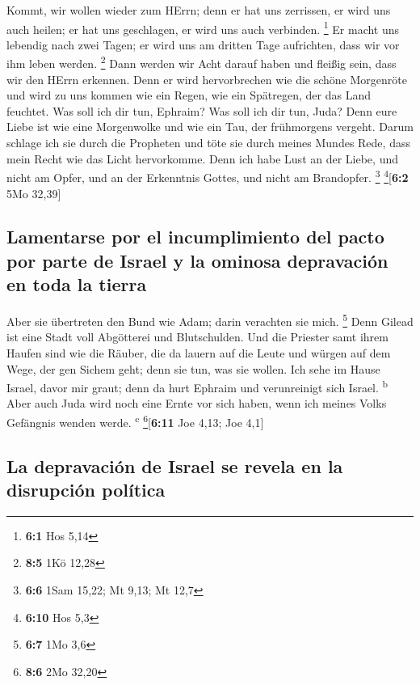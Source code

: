  Kommt, wir wollen wieder zum HErrn; denn er hat uns
zerrissen, er wird uns auch heilen; er hat uns geschlagen, er wird uns
auch verbinden. \footnote{\textbf{6:1} Hos 5,14}  Er macht
uns lebendig nach zwei Tagen; er wird uns am dritten Tage aufrichten,
dass wir vor ihm leben werden. \footnote{\textbf{8:5} 1Kö 12,28}
 Dann werden wir Acht darauf haben und fleißig sein, dass
wir den HErrn erkennen. Denn er wird hervorbrechen wie die schöne
Morgenröte und wird zu uns kommen wie ein Regen, wie ein Spätregen, der
das Land feuchtet.  Was soll ich dir tun, Ephraim? Was
soll ich dir tun, Juda? Denn eure Liebe ist wie eine Morgenwolke und wie
ein Tau, der frühmorgens vergeht.  Darum schlage ich sie
durch die Propheten und töte sie durch meines Mundes Rede, dass mein
Recht wie das Licht hervorkomme.  Denn ich habe Lust an
der Liebe, und nicht am Opfer, und an der Erkenntnis Gottes, und nicht
am Brandopfer. \footnote{\textbf{6:6} 1Sam 15,22; Mt 9,13; Mt 12,7}
\footnote{\textbf{6:10} Hos 5,3}{[}\textbf{6:2} 5Mo 32,39{]}

\hypertarget{lamentarse-por-el-incumplimiento-del-pacto-por-parte-de-israel-y-la-ominosa-depravaciuxf3n-en-toda-la-tierra}{%
\subsection{Lamentarse por el incumplimiento del pacto por parte de
Israel y la ominosa depravación en toda la
tierra}\label{lamentarse-por-el-incumplimiento-del-pacto-por-parte-de-israel-y-la-ominosa-depravaciuxf3n-en-toda-la-tierra}}

 Aber sie übertreten den Bund wie Adam; darin verachten
sie mich. \footnote{\textbf{6:7} 1Mo 3,6}  Denn Gilead ist
eine Stadt voll Abgötterei und Blutschulden.  Und die
Priester samt ihrem Haufen sind wie die Räuber, die da lauern auf die
Leute und würgen auf dem Wege, der gen Sichem geht; denn sie tun, was
sie wollen.  Ich sehe im Hause Israel, davor mir graut;
denn da hurt Ephraim und verunreinigt sich Israel. \textsuperscript{b}
 Aber auch Juda wird noch eine Ernte vor sich haben, wenn
ich meines Volks Gefängnis wenden werde. \textsuperscript{c}
\footnote{\textbf{8:6} 2Mo 32,20}{[}\textbf{6:11} Joe 4,13; Joe 4,1{]}

\hypertarget{la-depravaciuxf3n-de-israel-se-revela-en-la-disrupciuxf3n-poluxedtica}{%
\subsection{La depravación de Israel se revela en la disrupción
política}\label{la-depravaciuxf3n-de-israel-se-revela-en-la-disrupciuxf3n-poluxedtica}}

